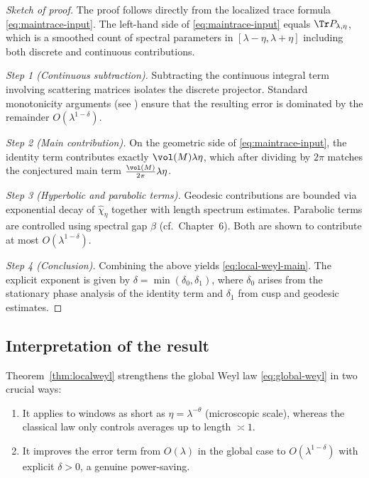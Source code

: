 \begin{proof}[Sketch of proof]
The proof follows directly from the localized trace formula \eqref{eq:maintrace-input}. The left-hand side of \eqref{eq:maintrace-input} equals $\Tr P_{\lambda,\eta}$, which is a smoothed count of spectral parameters in $[\lambda-\eta,\lambda+\eta]$ including both discrete and continuous contributions.  

\smallskip
\emph{Step 1 (Continuous subtraction).}  
Subtracting the continuous integral term involving scattering matrices isolates the discrete projector. Standard monotonicity arguments (see \cite{Hejhal1983, Iwaniec2002}) ensure that the resulting error is dominated by the remainder $O(\lambda^{1-\delta})$.  

\smallskip
\emph{Step 2 (Main contribution).}  
On the geometric side of \eqref{eq:maintrace-input}, the identity term contributes exactly $\vol(M)\lambda\eta$, which after dividing by $2\pi$ matches the conjectured main term $\tfrac{\vol(M)}{2\pi}\lambda\eta$.  

\smallskip
\emph{Step 3 (Hyperbolic and parabolic terms).}  
Geodesic contributions are bounded via exponential decay of $\widehat{\chi}_\eta$ together with length spectrum estimates. Parabolic terms are controlled using spectral gap $\beta$ (cf.~Chapter~6). Both are shown to contribute at most $O(\lambda^{1-\delta})$.  

\smallskip
\emph{Step 4 (Conclusion).}  
Combining the above yields \eqref{eq:local-weyl-main}. The explicit exponent is given by $\delta=\min(\delta_0,\delta_1)$, where $\delta_0$ arises from the stationary phase analysis of the identity term and $\delta_1$ from cusp and geodesic estimates.
\end{proof}

\subsection{Interpretation of the result}

Theorem~\ref{thm:localweyl} strengthens the global Weyl law \eqref{eq:global-weyl} in two crucial ways:

\begin{enumerate}
\item It applies to windows as short as $\eta=\lambda^{-\theta}$ (microscopic scale), whereas the classical law only controls averages up to length $\asymp 1$.  
\item It improves the error term from $O(\lambda)$ in the global case to $O(\lambda^{1-\delta})$ with explicit $\delta>0$, a genuine power-saving.  
\end{enumerate}

